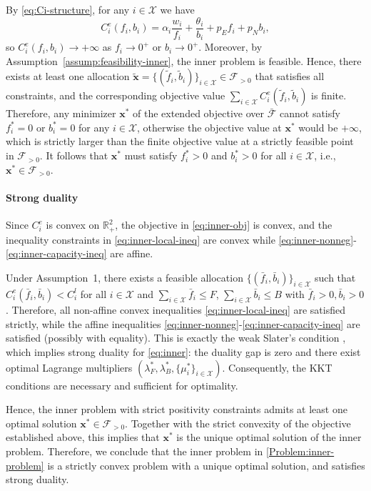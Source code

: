 \documentclass[lettersize,journal]{IEEEtran}
\begin{document}
By \eqref{eq:Ci-structure}, for any $i\in\mathcal{X}$ we have
\[
  C_i^e(f_i,b_i)
  = \alpha_i\frac{w_i}{f_i} + \frac{\theta_i}{b_i} + p_E f_i + p_N b_i,
\]
so $C_i^e(f_i,b_i)\to +\infty$ as $f_i\to 0^+$ or $b_i\to 0^+$.
Moreover, by Assumption~\ref{assump:feasibility-inner}, the inner problem is feasible.
Hence, there exists at least one allocation 
$\tilde{\mathbf{x}} = \{(\tilde f_i,\tilde b_i)\}_{i\in\mathcal{X}} \in \mathcal{F}_{>0}$ 
that satisfies all constraints, and the corresponding objective value 
$\sum_{i\in\mathcal{X}} C_i^e(\tilde f_i,\tilde b_i)$ is finite.
Therefore, any minimizer $\mathbf{x}^*$ of the extended objective over $\bar{\mathcal{F}}$ cannot
satisfy $f_i^*=0$ or $b_i^*=0$ for any $i\in\mathcal{X}$, otherwise the objective value at
$\mathbf{x}^*$ would be $+\infty$, which is strictly larger than the finite objective value at a
strictly feasible point in $\mathcal{F}_{>0}$.
It follows that $\mathbf{x}^*$ must satisfy $f_i^*>0$ and $b_i^*>0$ for all $i\in\mathcal{X}$,
i.e., $\mathbf{x}^* \in \mathcal{F}_{>0}$.

\paragraph{Strong duality}
Since $C_i^e$ is convex on $\mathbb{R}_{+}^2$, the objective in \eqref{eq:inner-obj} is convex, and the inequality constraints in \eqref{eq:inner-local-ineq} are convex while \eqref{eq:inner-nonneg}-\eqref{eq:inner-capacity-ineq} are affine.

Under Assumption~1, there exists a feasible allocation $\{(\bar f_i,\bar b_i)\}_{i\in\mathcal{X}}$ such that
$C_i^e(\bar f_i,\bar b_i) < C_i^l$ for all $i\in\mathcal{X}$ and
$\sum_{i\in\mathcal{X}} \bar f_i \le F$, $\sum_{i\in\mathcal{X}} \bar b_i \le B$ with $\bar f_i>0,\bar b_i>0$.
Therefore, all non-affine convex inequalities \eqref{eq:inner-local-ineq} are satisfied strictly, while the affine inequalities
\eqref{eq:inner-nonneg}-\eqref{eq:inner-capacity-ineq} are satisfied (possibly with equality). This is exactly the weak Slater's condition \cite{boyd2004convex}, which implies strong duality for \eqref{eq:inner}:
the duality gap is zero and there exist optimal Lagrange multipliers $(\lambda_F^*,\lambda_B^*,\{\mu_i^*\}_{i\in\mathcal{X}})$.
Consequently, the KKT conditions are necessary and sufficient for optimality.

Hence, the inner problem with strict positivity constraints admits at least one optimal solution 
$\mathbf{x}^* \in \mathcal{F}_{>0}$.
Together with the strict convexity of the objective established above, this implies that 
$\mathbf{x}^*$ is the unique optimal solution of the inner problem. Therefore, we conclude that the inner problem in \eqref{Problem:inner-problem} is a strictly convex problem with a unique optimal solution, and satisfies strong duality.
\end{document}
